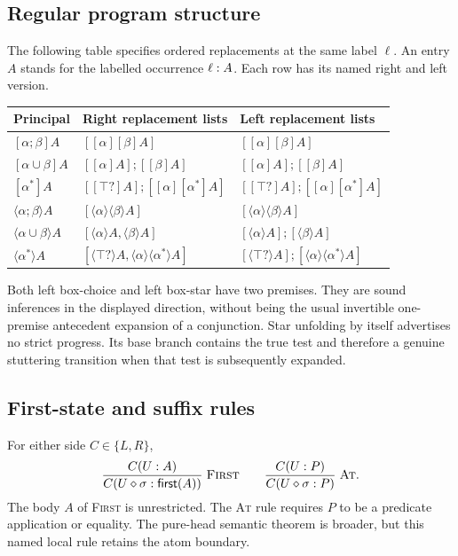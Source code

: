 \subsection{Regular program structure}
The following table specifies ordered replacements at the same label $\ell$.
An entry $A$ stands for the labelled occurrence $\ann{\ell}{A}$.
Each row has its named right and left version.
\begin{center}
\begin{tabular}{@{}lll@{}}
\toprule
Principal & Right replacement lists & Left replacement lists\\
\midrule
$[\alpha;\beta]A$ & $[[\alpha][\beta]A]$ & $[[\alpha][\beta]A]$\\
$[\alpha\cup\beta]A$ & $[[\alpha]A];[[\beta]A]$ & $[[\alpha]A];[[\beta]A]$\\
$[\alpha^*]A$ & $[[\top?]A];[[\alpha][\alpha^*]A]$
  & $[[\top?]A];[[\alpha][\alpha^*]A]$\\
$\langle\alpha;\beta\rangle A$ & $[\langle\alpha\rangle\langle\beta\rangle A]$
  & $[\langle\alpha\rangle\langle\beta\rangle A]$\\
$\langle\alpha\cup\beta\rangle A$ & $[\langle\alpha\rangle A,\langle\beta\rangle A]$
  & $[\langle\alpha\rangle A];[\langle\beta\rangle A]$\\
$\langle\alpha^*\rangle A$ & $[\langle\top?\rangle A,\langle\alpha\rangle\langle\alpha^*\rangle A]$
  & $[\langle\top?\rangle A];[\langle\alpha\rangle\langle\alpha^*\rangle A]$\\
\bottomrule
\end{tabular}
\end{center}

Both left box-choice and left box-star have two premises. They are sound
inferences in the displayed direction, without being the usual invertible
one-premise antecedent expansion of a conjunction. Star unfolding by itself
advertises no strict progress. Its base branch contains the true test and
therefore a genuine stuttering transition when that test is subsequently
expanded.

\subsection{First-state and suffix rules}
For either side $C\in\{L,R\}$,
\[
 \Rule{First}{C(\ann{U}{A})}{C(\ann{U\jlabel\sigma}{\Fst{A}})}
 \qquad
 \Rule{At}{C(\ann{U}{P})}{C(\ann{U\jlabel\sigma}{P})}.
\]
The body $A$ of \textsc{First} is unrestricted. The \textsc{At} rule requires
$P$ to be a predicate application or equality. The pure-head semantic theorem
is broader, but this named local rule retains the atom boundary.

